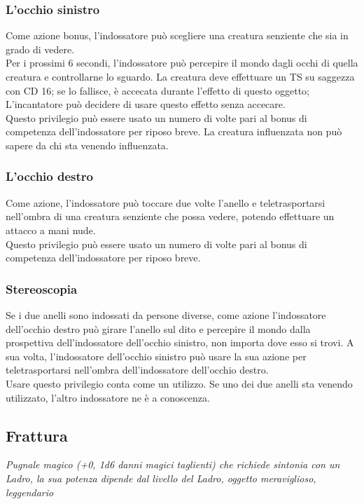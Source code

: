 \subsubsection{L'occhio sinistro}
Come azione bonus, l'indossatore può scegliere una creatura senziente che sia in grado di vedere. \\ Per i prossimi 6 secondi, l'indossatore può percepire il mondo dagli occhi di quella creatura e controllarne lo sguardo. La creatura deve effettuare un TS su saggezza con CD 16; se lo fallisce, è accecata durante l'effetto di questo oggetto; L'incantatore può decidere di usare questo effetto senza accecare. \\ Questo privilegio può essere usato un numero di volte pari al bonus di competenza dell'indossatore per riposo breve. La creatura influenzata non può sapere da chi sta venendo influenzata.

\subsubsection{L'occhio destro}
Come azione, l'indossatore può toccare due volte l'anello e teletrasportarsi nell'ombra di una creatura senziente che possa vedere, potendo effettuare un attacco a mani nude. \\ Questo privilegio può essere usato un numero di volte pari al bonus di competenza dell'indossatore per riposo breve.

\subsubsection{Stereoscopia}
Se i due anelli sono indossati da persone diverse, come azione l'indossatore dell'occhio destro può girare l'anello sul dito e percepire il mondo dalla prospettiva dell'indossatore dell'occhio sinistro, non importa dove esso si trovi. A sua volta, l'indossatore dell'occhio sinistro può usare la sua azione per teletrasportarsi nell'ombra dell'indossatore dell'occhio destro. \\ Usare questo privilegio conta come un utilizzo. Se uno dei due anelli sta venendo utilizzato, l'altro indossatore ne è a conoscenza.

\subsection{Frattura}
\textit{Pugnale magico (+0, 1d6 danni magici taglienti) che richiede sintonia con un Ladro, la sua potenza dipende dal livello del Ladro, oggetto meraviglioso, leggendario}

